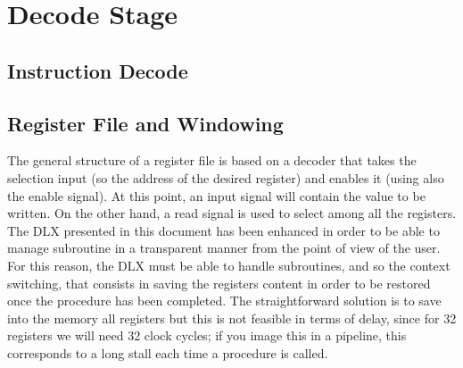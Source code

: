 \chapter{Decode Stage}
\label{sec:decode_stage}

\section{Instruction Decode}
\section{Register File and Windowing}
The general structure of a register file is based on a decoder that takes the selection input (so the address of the desired register) and enables it (using also the enable signal). At this point, an input signal will contain the value to be written. On the other hand, a read signal is used to select among all the registers.\newline\newline
The DLX presented in this document has been enhanced in order to be able to manage subroutine in a transparent manner from the point of view of the user. For this reason, the DLX must be able to handle subroutines, and so the context switching, that consists in saving the
registers content in order to be restored once the procedure has been completed. The straightforward solution is to save into the memory all registers but this is not feasible in terms of delay, since for 32 registers we will need 32 clock cycles; if you image this in a pipeline, this corresponds to a long stall each time a procedure is called.

